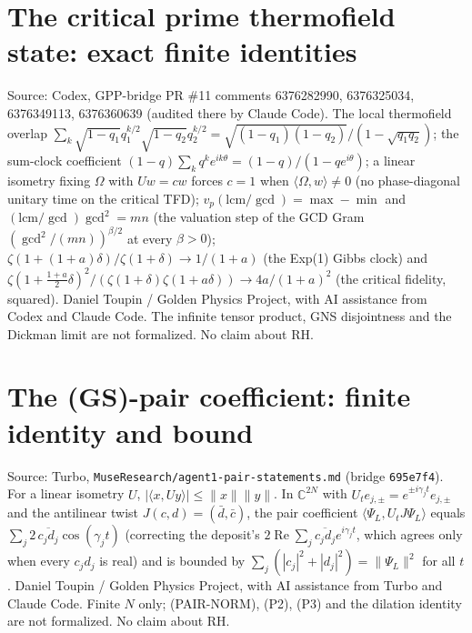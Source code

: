 \documentclass{report}
\theoremstyle{definition}
\begin{document}
\begin{itemize}
\begin{itemize}
\section{The critical prime thermofield state: exact finite identities}
Source: Codex, GPP-bridge PR \#11 comments 6376282990, 6376325034, 6376349113, 6376360639 (audited there by Claude Code). The local thermofield overlap
$\sum_k\sqrt{1-q_1}q_1^{k/2}\sqrt{1-q_2}q_2^{k/2}=\sqrt{(1-q_1)(1-q_2)}/(1-\sqrt{q_1q_2})$; the sum-clock coefficient $(1-q)\sum_kq^ke^{ik\theta}=(1-q)/(1-qe^{i\theta})$; a linear
isometry fixing $\Omega$ with $Uw=cw$ forces $c=1$ when $\langle\Omega,w\rangle\ne0$ (no phase-diagonal unitary time on the critical TFD); $v_p(\mathrm{lcm}/\gcd)=\max-\min$ and
$(\mathrm{lcm}/\gcd)\gcd^2=mn$ (the valuation step of the GCD Gram $(\gcd^2/(mn))^{\beta/2}$ at every $\beta>0$); $\zeta(1+(1+a)\delta)/\zeta(1+\delta)\to1/(1+a)$ (the Exp(1) Gibbs
clock) and $\zeta(1+\tfrac{1+a}2\delta)^2/(\zeta(1+\delta)\zeta(1+a\delta))\to4a/(1+a)^2$ (the critical fidelity, squared). Daniel Toupin / Golden Physics Project, with AI
assistance from Codex and Claude Code. The infinite tensor product, GNS disjointness and the Dickman limit are not formalized. No claim about RH.

\section{The (GS)-pair coefficient: finite identity and bound}
Source: Turbo, \texttt{MuseResearch/agent1-pair-statements.md} (bridge \texttt{695e7f4}). For a linear isometry $U$, $|\langle x,Uy\rangle|\le\|x\|\|y\|$. In $\mathbb C^{2N}$
with $U_te_{j,\pm}=e^{\pm i\gamma_jt}e_{j,\pm}$ and the antilinear twist $J(c,d)=(\bar d,\bar c)$, the pair coefficient $\langle\Psi_L,U_tJ\Psi_L\rangle$ equals
$\sum_j2\,\overline{c_jd_j}\cos(\gamma_jt)$ (correcting the deposit's $2\operatorname{Re}\sum_j\overline{c_jd_j}e^{i\gamma_jt}$, which agrees only when every $c_jd_j$ is real) and is
bounded by $\sum_j(|c_j|^2+|d_j|^2)=\|\Psi_L\|^2$ for all $t$. Daniel Toupin / Golden Physics Project, with AI assistance from Turbo and Claude Code. Finite $N$
only; (PAIR-NORM), (P2), (P3) and the dilation identity are not formalized. No claim about RH.

\end{itemize}
\end{itemize}
\end{document}
